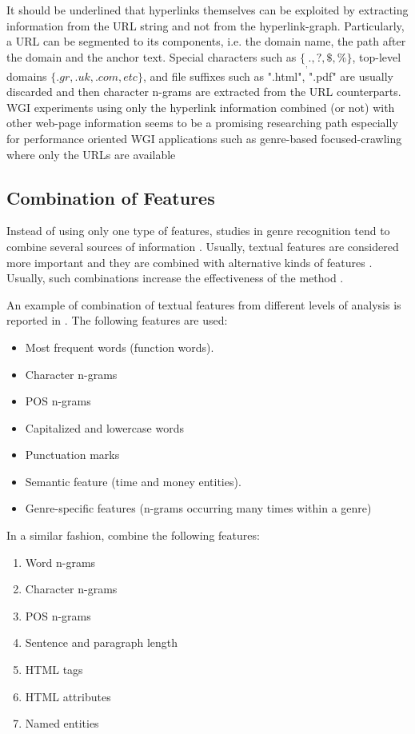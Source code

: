 It should be underlined that hyperlinks themselves can be exploited by extracting information from the URL string and not from the hyperlink-graph. Particularly, a URL can be segmented to its components, i.e. the domain name, the path after the domain and the anchor text. Special characters such as $\{_ , . , ?, \$ , \%\}$, top-level domains $\{.gr , .uk , .com, etc\}$, and file suffixes such as ".html", ".pdf" are usually discarded and then character n-grams are extracted from the URL counterparts. WGI experiments using only the hyperlink information combined (or not) with other web-page information seems to be a promising researching path especially for performance oriented WGI applications such as genre-based focused-crawling where only the URLs are available \parencite{jebari2014pureURL,jebari2015combination,abramson2012_URL,priyatam2013don_URL} 

\subsection{Combination of Features}

Instead of using only one type of features, studies in genre recognition tend to combine several sources of information \parencite{Lim2005}. Usually, textual features are considered more important and they are combined with alternative kinds of features . Usually, such combinations increase the effectiveness of the method \parencite{kanaris2009learning}.

An example of combination of textual features from different levels of analysis is reported in \parencite{onan2018ensemble}. The following features are used:

\begin{itemize}
\item Most frequent words (function words). 
\item Character n-grams
\item POS n-grams
\item Capitalized and lowercase words
\item Punctuation marks 
\item Semantic feature (time and money entities).
\item Genre-specific features (n-grams occurring many times within a genre)
\end{itemize}

In a similar fashion, \parencite{waltinger2010feature} combine the following features:

\begin{enumerate}
\item Word n-grams
\item Character n-grams
\item POS n-grams
\item Sentence and paragraph length
\item HTML tags
\item HTML attributes
\item Named entities
\end{enumerate}

